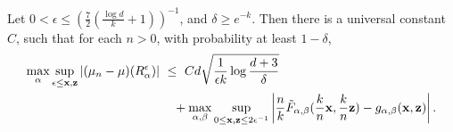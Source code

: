 \begin{corollary}
\label{jmva:cor:mu_n-mu}
Let $0 < \epsilon \le (\frac{7}{2}(\frac{\log d}{k} + 1))^{-1}$, and $\delta \ge e^{-k}$.
Then there is a universal constant $C$, such that for each $n>0$, with probability at least $1 - \delta$,
\begin{align}
\max_{\alpha} \sup_{ \epsilon \le \mathbf x, \mathbf z } &\left| (\mu_n-\mu)(R_\alpha^\epsilon) \right| ~\le~  Cd\sqrt{\frac{1}{\epsilon k}\log\frac{d+3}{\delta}} 
\\\nonumber &~~~~~~~~~~~~~~~~~~~~~~~+ \max_{\alpha, \beta}  \sup_{0 \le \mathbf x, \mathbf z \le 2\epsilon^{-1}}\left|\frac{n}{k} \tilde F_{\alpha, \beta}( \frac{k}{n} \mathbf x, \frac{k}{n} \mathbf z)- g_{\alpha, \beta}(\mathbf x, \mathbf z)\right|.
\end{align}
\end{corollary}


